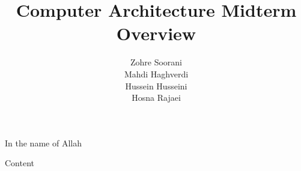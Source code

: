 \documentclass[aspectratio=169, dvipsnames, svgnames, x11names]{beamer}
\title{Computer Architecture Midterm Overview}
\author{
Zohre Soorani\\
Mahdi Haghverdi\\
Hussein Husseini\\
Hosna Rajaei\\
}
\institute{
    \\\texttt{[image: logos/logo]}\\
    Isfahan University
}
\begin{document}
\begin{frame}[plain]
\begin{center}
In the name of Allah
\end{center}
\maketitle
\end{frame}

\setcounter{framenumber}{0}
\raggedleft

\begin{frame}{Content}
\begin{flushleft}
\tableofcontents
\end{flushleft}
\end{frame}



\end{document}
